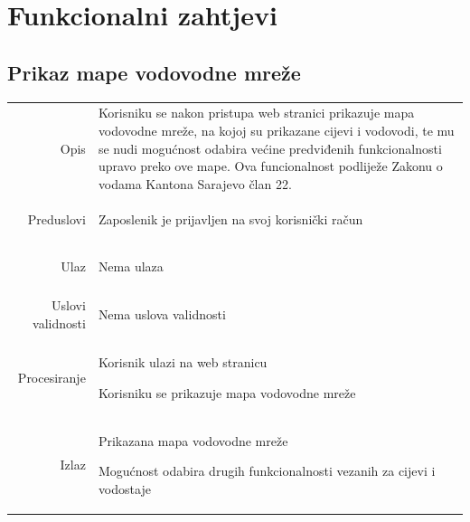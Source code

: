 \documentclass[]{report}
\begin{document}

\begingroup
\renewcommand{\cleardoublepage}{}
\renewcommand{\clearpage}{}
\section{Funkcionalni zahtjevi}
\endgroup

\subsection{Prikaz mape vodovodne mreže}
  
\begin{tabular}{rp{}}
Opis &
Korisniku se nakon pristupa web stranici prikazuje mapa vodovodne mreže, na kojoj su prikazane cijevi i vodovodi, te mu se nudi mogućnost odabira većine predviđenih funkcionalnosti upravo preko ove mape.  Ova funcionalnost podliježe Zakonu o vodama Kantona Sarajevo član 22.
\hspace{12pt} 

\\
Preduslovi &
\begin{compactitem}
   \item Zaposlenik je prijavljen na svoj korisnički račun
\end{compactitem}
 
\\
Ulaz &
\begin{compactitem}
   \item Nema ulaza
\end{compactitem}
\\
Uslovi validnosti &
 \begin{compactitem}
   \item Nema uslova validnosti
\end{compactitem}

\\
Procesiranje &
 
\begin{compactitem}
   \item Korisnik ulazi na web stranicu
   \item Korisniku se prikazuje mapa vodovodne mreže
\end{compactitem}
 
\\
Izlaz &
 
\begin{compactitem}
   \item Prikazana mapa vodovodne mreže
   \item Mogućnost odabira drugih funkcionalnosti vezanih za cijevi i vodostaje
\end{compactitem}


\end{tabular}
\end{document}
